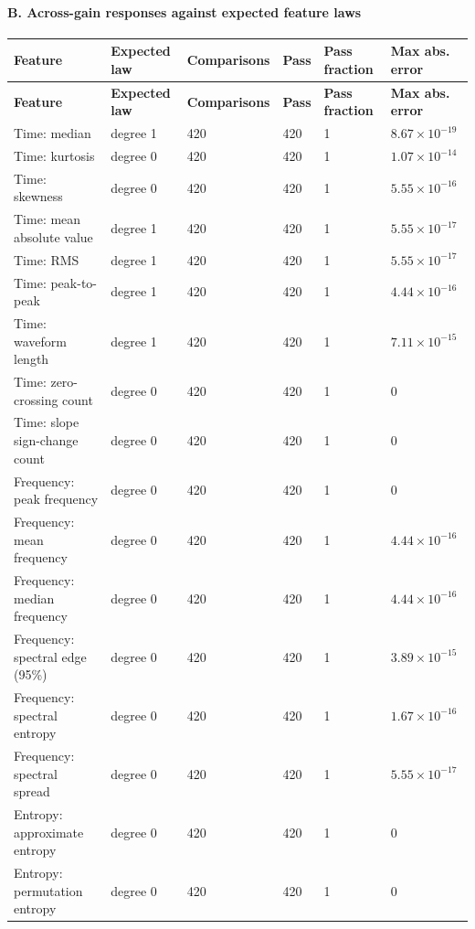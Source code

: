 \documentclass[10pt]{article}
\begin{document}
\begin{landscape}
\paragraph{B. Across-gain responses against expected feature laws}\begin{longtable}{p{3.6cm}p{2.0cm}p{2.4cm}p{1.2cm}p{2.1cm}p{2.4cm}}
\toprule
\textbf{Feature} & \textbf{Expected law} & \textbf{Comparisons} & \textbf{Pass} & \textbf{Pass fraction} & \textbf{Max abs. error} \\
\midrule
\endfirsthead
\toprule
\textbf{Feature} & \textbf{Expected law} & \textbf{Comparisons} & \textbf{Pass} & \textbf{Pass fraction} & \textbf{Max abs. error} \\
\midrule
\endhead
Time: median & degree 1 & 420 & 420 & 1 & $8.67\times10^{-19}$ \\
Time: kurtosis & degree 0 & 420 & 420 & 1 & $1.07\times10^{-14}$ \\
Time: skewness & degree 0 & 420 & 420 & 1 & $5.55\times10^{-16}$ \\
Time: mean absolute value & degree 1 & 420 & 420 & 1 & $5.55\times10^{-17}$ \\
Time: RMS & degree 1 & 420 & 420 & 1 & $5.55\times10^{-17}$ \\
Time: peak-to-peak & degree 1 & 420 & 420 & 1 & $4.44\times10^{-16}$ \\
Time: waveform length & degree 1 & 420 & 420 & 1 & $7.11\times10^{-15}$ \\
Time: zero-crossing count & degree 0 & 420 & 420 & 1 & 0 \\
Time: slope sign-change count & degree 0 & 420 & 420 & 1 & 0 \\
Frequency: peak frequency & degree 0 & 420 & 420 & 1 & 0 \\
Frequency: mean frequency & degree 0 & 420 & 420 & 1 & $4.44\times10^{-16}$ \\
Frequency: median frequency & degree 0 & 420 & 420 & 1 & $4.44\times10^{-16}$ \\
Frequency: spectral edge (95\%) & degree 0 & 420 & 420 & 1 & $3.89\times10^{-15}$ \\
Frequency: spectral entropy & degree 0 & 420 & 420 & 1 & $1.67\times10^{-16}$ \\
Frequency: spectral spread & degree 0 & 420 & 420 & 1 & $5.55\times10^{-17}$ \\
Entropy: approximate entropy & degree 0 & 420 & 420 & 1 & 0 \\
Entropy: permutation entropy & degree 0 & 420 & 420 & 1 & 0 \\

\end{longtable}
\end{landscape}
\end{document}
